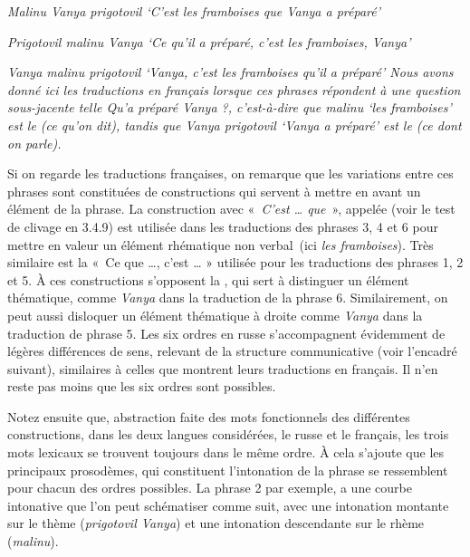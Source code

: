 {    \ex\itshape Malinu Vanya prigotovil
    \glt   ‘C’est les framboises que Vanya a préparé’

    \ex\itshape Prigotovil malinu Vanya
    \glt ‘Ce qu’il a préparé, c’est les framboises, Vanya’

    \ex\itshape Vanya malinu prigotovil
    \glt  ‘Vanya, c’est les framboises qu’il a préparé’
\z
\z
    Nous avons donné ici les traductions en français lorsque ces phrases répondent à une question sous-jacente telle \textit{Qu’a préparé Vanya} ?, c’est-à-dire que \textit{malinu} ‘les framboises’ est le  (ce qu’on dit), tandis que \textit{Vanya prigotovil} ‘Vanya a préparé’ est le  (ce dont on parle).

    Si on regarde les traductions françaises, on remarque que les variations entre ces phrases sont constituées de constructions qui servent à mettre en avant un élément de la phrase. La construction avec «~\textit{C’est … que}~», appelée  (voir le test de clivage en 3.4.9) est utilisée dans les traductions des phrases 3, 4 et 6 pour mettre en valeur un élément rhématique non verbal~(ici \textit{les framboises}). Très similaire est la  «~Ce que …, c’est … » utilisée pour les traductions des phrases 1, 2 et 5. À ces constructions s’opposent la , qui sert à distinguer un élément thématique, comme \textit{Vanya} dans la traduction de la phrase 6. Similairement, on peut aussi disloquer un élément thématique à droite comme \textit{Vanya} dans la traduction de phrase 5. Les six ordres en russe s’accompagnent évidemment de légères différences de sens, relevant de la structure communicative (voir l’encadré suivant), similaires à celles que montrent leurs traductions en français. Il n’en reste pas moins que les six ordres sont possibles.

    Notez ensuite que, abstraction faite des mots fonctionnels des différentes constructions, dans les deux langues considérées, le russe et le français, les trois mots lexicaux se trouvent toujours dans le même ordre. À cela s’ajoute que les principaux prosodèmes, qui constituent l’intonation de la phrase se ressemblent pour chacun des ordres possibles. La phrase 2 par exemple, a une courbe intonative que l’on peut schématiser comme suit, avec une intonation montante sur le thème (\textit{prigotovil Vanya}) et une intonation descendante sur le rhème (\textit{malinu}).

    \ea

}
